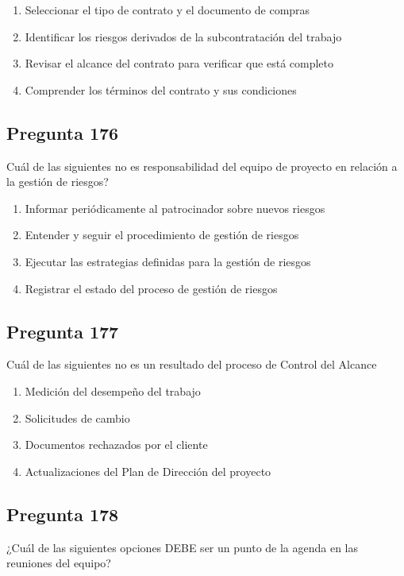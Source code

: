 \documentclass[11pt,a4paper]{article}
\begin{document}
\begin{enumerate}[label=\alph*)]
  \item Seleccionar el tipo de contrato y el documento de compras
  \item Identificar los riesgos derivados de la subcontratación del trabajo
  \item Revisar el alcance del contrato para verificar que está completo
  \item Comprender los términos del contrato y sus condiciones
\end{enumerate}

\subsection*{Pregunta 176}
Cuál de las siguientes no es responsabilidad del equipo de proyecto en relación a la gestión de riesgos?

\begin{enumerate}[label=\alph*)]
  \item Informar periódicamente al patrocinador sobre nuevos riesgos
  \item Entender y seguir el procedimiento de gestión de riesgos
  \item Ejecutar las estrategias definidas para la gestión de riesgos
  \item Registrar el estado del proceso de gestión de riesgos
\end{enumerate}

\subsection*{Pregunta 177}
Cuál de las siguientes no es un resultado del proceso de Control del Alcance

\begin{enumerate}[label=\alph*)]
  \item Medición del desempeño del trabajo
  \item Solicitudes de cambio
  \item Documentos rechazados por el cliente
  \item Actualizaciones del Plan de Dirección del proyecto
\end{enumerate}

\subsection*{Pregunta 178}
¿Cuál de las siguientes opciones DEBE ser un punto de la agenda en las reuniones del equipo?
\end{document}

